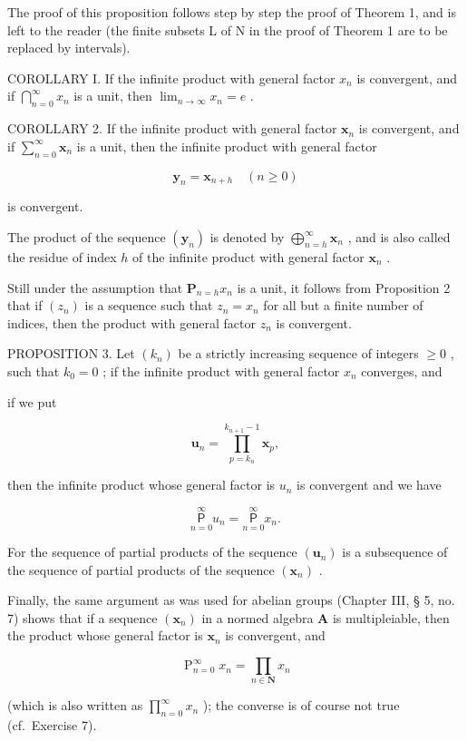 The proof of this proposition follows step by step the proof of Theorem 1, and is left to the reader (the finite subsets L of N in the proof of Theorem 1 are to be replaced by intervals).

COROLLARY I. If the infinite product with general factor \(x_{n}\) is convergent, and if \(\bigcap_{n=0}^{\infty}x_{n}\) is a unit, then \(\lim_{n\to\infty}x_{n}=e\) .

COROLLARY 2. If the infinite product with general factor \(\pmb{x}_n\) is convergent, and if \(\mathop{\sum }\limits_{{n = 0}}^{\infty}{\pmb{x}}_{n}\) is a unit, then the infinite product with general factor

\[
\mathbf {y} _ {n} = \mathbf {x} _ {n + h} \quad (n \geqslant 0)
\]

is convergent.

The product of the sequence \((\mathbf{y}_n)\) is denoted by \(\bigoplus_{n = h}^{\infty}\mathbf{x}_n\) , and is also called the residue of index \(h\) of the infinite product with general factor \(\mathbf{x}_n\) .

Still under the assumption that \(\mathbf{P}_{n=h} x_n\) is a unit, it follows from Proposition 2 that if \((z_n)\) is a sequence such that \(z_n = x_n\) for all but a finite number of indices, then the product with general factor \(z_n\) is convergent.

PROPOSITION 3. Let \((k_{n})\) be a strictly increasing sequence of integers \(\geqslant 0\) , such that \(k_{0} = 0\) ; if the infinite product with general factor \(x_{n}\) converges, and

if we put

\[
\boldsymbol {u} _ {n} = \prod_ {p = k _ {n}} ^ {k _ {n + 1} - 1} \boldsymbol {x} _ {p},
\]

then the infinite product whose general factor is \(u_{n}\) is convergent and we have

\[
\underset {n = 0} {\overset {\infty} {\mathsf {P}}} u _ {n} = \underset {n = 0} {\overset {\infty} {\mathsf {P}}} x _ {n}.
\]

For the sequence of partial products of the sequence \((\boldsymbol{u}_{n})\) is a subsequence of the sequence of partial products of the sequence \((\boldsymbol{x}_{n})\) .

Finally, the same argument as was used for abelian groups (Chapter III, § 5, no. 7) shows that if a sequence \((\pmb{x}_n)\) in a normed algebra \(\mathbf{A}\) is multipleiable, then the product whose general factor is \(\pmb{x}_n\) is convergent, and

\[
\mathop {\text { P }} _ {n = 0} ^ {\infty} x _ {n} = \prod_ {n \in \mathbf {N}} x _ {n}
\]

(which is also written as \(\prod_{n=0}^{\infty} x_n\) ); the converse is of course not true (cf.~Exercise 7).
